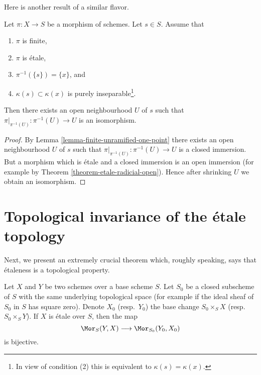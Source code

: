 \noindent
Here is another result of a similar flavor.

\begin{lemma}
\label{lemma-finite-etale-one-point}
Let $\pi : X \to S$ be a morphism of schemes. Let $s \in S$.
Assume that
\begin{enumerate}
\item $\pi$ is finite,
\item $\pi$ is \'etale,
\item $\pi^{-1}(\{s\}) = \{x\}$, and
\item $\kappa(s) \subset \kappa(x)$ is purely
inseparable\footnote{In view of condition (2)
this is equivalent to $\kappa(s) = \kappa(x)$.}.
\end{enumerate}
Then there exists an open neighbourhood $U$ of $s$ such that
$\pi|_{\pi^{-1}(U)} : \pi^{-1}(U) \to U$ is an isomorphism.
\end{lemma}

\begin{proof}
By
Lemma \ref{lemma-finite-unramified-one-point}
there exists an open neighbourhood $U$ of $s$ such that
$\pi|_{\pi^{-1}(U)} : \pi^{-1}(U) \to U$ is a closed immersion.
But a morphism which is \'etale and a closed immersion is an
open immersion (for example by
Theorem \ref{theorem-etale-radicial-open}).
Hence after shrinking $U$ we obtain an isomorphism.
\end{proof}




\section{Topological invariance of the \'etale topology}
\label{section-topological-invariance}

\noindent
Next, we present an extremely crucial theorem which, roughly speaking, says
that \'etaleness is a topological property.

\begin{theorem}
\label{theorem-etale-topological}
Let $X$ and $Y$ be two schemes over a base scheme $S$. Let $S_0$ be a closed
subscheme of $S$ with the same underlying topological space
(for example if the ideal sheaf of $S_0$ in $S$ has square zero).
Denote $X_0$ (resp.\ $Y_0$) the base change $S_0 \times_S X$
(resp.\ $S_0 \times_S Y$).
If $X$ is \'etale over $S$, then the map
$$
\Mor_S(Y, X) \longrightarrow \Mor_{S_0}(Y_0, X_0)
$$
is bijective.
\end{theorem}

